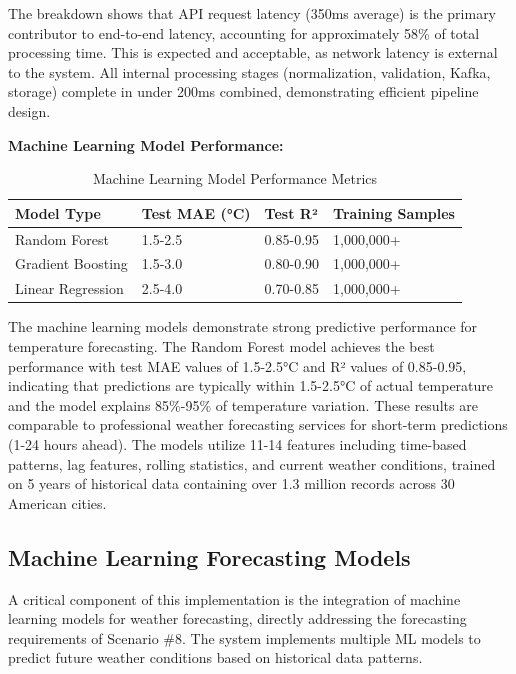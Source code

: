 \documentclass[12pt,a4paper]{article}
\begin{document}
The breakdown shows that API request latency (350ms average) is the primary contributor to end-to-end latency, accounting for approximately 58\% of total processing time. This is expected and acceptable, as network latency is external to the system. All internal processing stages (normalization, validation, Kafka, storage) complete in under 200ms combined, demonstrating efficient pipeline design.

\textbf{Machine Learning Model Performance:}
\begin{table}[H]
\centering
\begin{tabular}{|l|l|l|l|}
\hline
\textbf{Model Type} & \textbf{Test MAE (°C)} & \textbf{Test R²} & \textbf{Training Samples} \\
\hline
Random Forest & 1.5-2.5 & 0.85-0.95 & 1,000,000+ \\
Gradient Boosting & 1.5-3.0 & 0.80-0.90 & 1,000,000+ \\
Linear Regression & 2.5-4.0 & 0.70-0.85 & 1,000,000+ \\
\hline
\end{tabular}
\caption{Machine Learning Model Performance Metrics}
\label{tab:ml-performance}
\end{table}

The machine learning models demonstrate strong predictive performance for temperature forecasting. The Random Forest model achieves the best performance with test MAE values of 1.5-2.5°C and R² values of 0.85-0.95, indicating that predictions are typically within 1.5-2.5°C of actual temperature and the model explains 85\%-95\% of temperature variation. These results are comparable to professional weather forecasting services for short-term predictions (1-24 hours ahead). The models utilize 11-14 features including time-based patterns, lag features, rolling statistics, and current weather conditions, trained on 5 years of historical data containing over 1.3 million records across 30 American cities.

\subsection{Machine Learning Forecasting Models}

A critical component of this implementation is the integration of machine learning models for weather forecasting, directly addressing the forecasting requirements of Scenario \#8. The system implements multiple ML models to predict future weather conditions based on historical data patterns.
\end{document}
